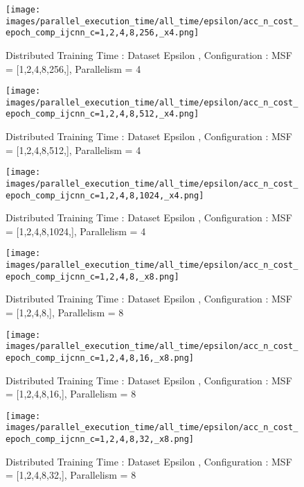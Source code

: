 \begin{figure*}[htbp]
\centering
\texttt{[image: images/parallel\_execution\_time/all\_time/epsilon/acc\_n\_cost\_epoch\_comp\_ijcnn\_c=1,2,4,8,256,\_x4.png]}
\caption{Distributed Training Time : Dataset Epsilon , Configuration : MSF = [1,2,4,8,256,], Parallelism = 4}
\label{fig:dis-msf-tr-time-epsilon-x4}
\end{figure*}


\begin{figure*}[htbp]
\centering
\texttt{[image: images/parallel\_execution\_time/all\_time/epsilon/acc\_n\_cost\_epoch\_comp\_ijcnn\_c=1,2,4,8,512,\_x4.png]}
\caption{Distributed Training Time : Dataset Epsilon , Configuration : MSF = [1,2,4,8,512,], Parallelism = 4}
\label{fig:dis-msf-tr-time-epsilon-x4}
\end{figure*}


\begin{figure*}[htbp]
\centering
\texttt{[image: images/parallel\_execution\_time/all\_time/epsilon/acc\_n\_cost\_epoch\_comp\_ijcnn\_c=1,2,4,8,1024,\_x4.png]}
\caption{Distributed Training Time : Dataset Epsilon , Configuration : MSF = [1,2,4,8,1024,], Parallelism = 4}
\label{fig:dis-msf-tr-time-epsilon-x4}
\end{figure*}


\begin{figure*}[htbp]
\centering
\texttt{[image: images/parallel\_execution\_time/all\_time/epsilon/acc\_n\_cost\_epoch\_comp\_ijcnn\_c=1,2,4,8,\_x8.png]}
\caption{Distributed Training Time : Dataset Epsilon , Configuration : MSF = [1,2,4,8,], Parallelism = 8}
\label{fig:dis-msf-tr-time-epsilon-x8}
\end{figure*}


\begin{figure*}[htbp]
\centering
\texttt{[image: images/parallel\_execution\_time/all\_time/epsilon/acc\_n\_cost\_epoch\_comp\_ijcnn\_c=1,2,4,8,16,\_x8.png]}
\caption{Distributed Training Time : Dataset Epsilon , Configuration : MSF = [1,2,4,8,16,], Parallelism = 8}
\label{fig:dis-msf-tr-time-epsilon-x8}
\end{figure*}


\begin{figure*}[htbp]
\centering
\texttt{[image: images/parallel\_execution\_time/all\_time/epsilon/acc\_n\_cost\_epoch\_comp\_ijcnn\_c=1,2,4,8,32,\_x8.png]}
\caption{Distributed Training Time : Dataset Epsilon , Configuration : MSF = [1,2,4,8,32,], Parallelism = 8}
\label{fig:dis-msf-tr-time-epsilon-x8}
\end{figure*}


